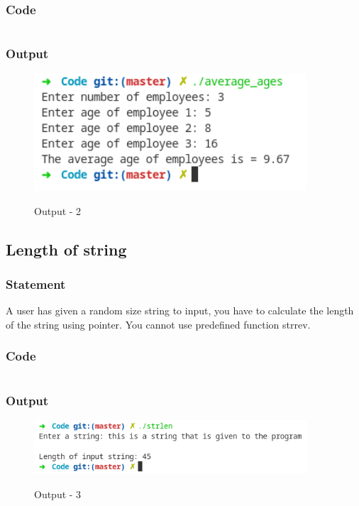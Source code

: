 \subsubsection{Code}
\inputminted[]{c}{../Code/average_ages.cpp}
\pagebreak
\subsubsection{Output}
\begin{figure}[!htb]
  \centering
  \includegraphics[width=4in]{Images/average.png}
  \label{Output-2}
  \caption{Output - 2}
\end{figure}


\pagebreak
\subsection{Length of string}

\subsubsection{Statement}
A user has given a random size string to input, you have to calculate the length of the
string using pointer. You cannot use predefined function strrev.

\subsubsection{Code}
\inputminted[]{c}{../Code/strlen.cpp}
\subsubsection{Output}
\begin{figure}[!htb]
  \centering
  \includegraphics[width=4in]{Images/strlen.png}
  \label{Output-3}
  \caption{Output - 3}
\end{figure}

